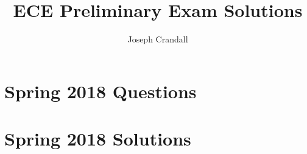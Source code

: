 
\usepackage{algorithm, algpseudocode, chemformula, color, gensymb, siunitx, soul, subfiles}
\usepackage[a4paper]{geometry}

\title{ECE Preliminary Exam Solutions}
\author{Joseph Crandall}


\maketitle

\section{Spring 2018 Questions}


\section{Spring 2018 Solutions}



